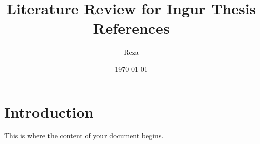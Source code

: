 \documentclass{article}
\title{Literature Review for Ingur Thesis References}
\author{Reza}
\date{\today}
\begin{document}
	
	\maketitle
	
	\section*{Introduction}
	

	This is where the content of your document begins. \cite{smith2023}
	
	
	
	
	
	
	
	
	
	
	
	
	
\end{document}
